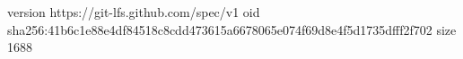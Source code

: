 version https://git-lfs.github.com/spec/v1
oid sha256:41b6c1e88e4df84518c8cdd473615a6678065e074f69d8e4f5d1735dfff2f702
size 1688
